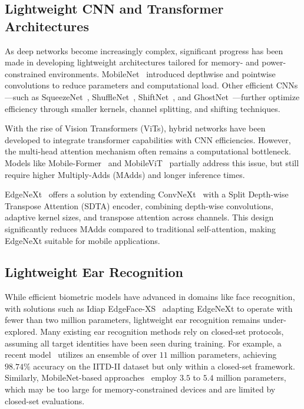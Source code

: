 \documentclass[a4paper, 10pt, conference]{ieeeconf}
\begin{document}
\subsection{Lightweight CNN and Transformer Architectures}
As deep networks become increasingly complex, significant progress has been made in developing lightweight architectures tailored for memory- and power-constrained environments. MobileNet~\cite{Howard_mobilenet, Sandler_mobilenetv2} introduced depthwise and pointwise convolutions to reduce parameters and computational load. Other efficient CNNs—such as SqueezeNet~\cite{Iandola2_squeezenet}, ShuffleNet~\cite{Zhang_shufflenet}, ShiftNet~\cite{Wu_shift}, and GhostNet~\cite{Han_ghostnet}—further optimize efficiency through smaller kernels, channel splitting, and shifting techniques.

With the rise of Vision Transformers (ViTs), hybrid networks have been developed to integrate transformer capabilities with CNN efficiencies. However, the multi-head attention mechanism often remains a computational bottleneck. Models like Mobile-Former~\cite{Chen_mobileformer} and MobileViT~\cite{Mehta_mobilevit} partially address this issue, but still require higher Multiply-Adds (MAdds) and longer inference times.

EdgeNeXt~\cite{Maaz_edgenext} offers a solution by extending ConvNeXt~\cite{liu_convnext} with a Split Depth-wise Transpose Attention (SDTA) encoder, combining depth-wise convolutions, adaptive kernel sizes, and transpose attention across channels. This design significantly reduces MAdds compared to traditional self-attention, making EdgeNeXt suitable for mobile applications.


\subsection{Lightweight Ear Recognition}

While efficient biometric models have advanced in domains like face recognition, with solutions such as Idiap EdgeFace-XS~\cite{George_IEEETBIOM_2024} adapting EdgeNeXt to operate with fewer than two million parameters, lightweight ear recognition remains under-explored. Many existing ear recognition methods rely on closed-set protocols, assuming all target identities have been seen during training. For example, a recent model~\cite{mehta2024efficient} utilizes an ensemble of over $11$ million parameters, achieving $98.74\%$ accuracy on the IITD-II dataset but only within a closed-set framework. Similarly, MobileNet-based approaches~\cite{xu2022efficient} employ $3.5$ to $5.4$ million parameters, which may be too large for memory-constrained devices and are limited by closed-set evaluations.
\end{document}
